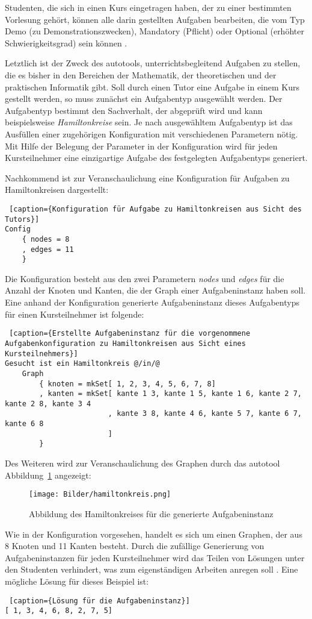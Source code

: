 Studenten, die sich in einen Kurs eingetragen haben, der zu einer bestimmten Vorlesung gehört, können alle darin gestellten Aufgaben bearbeiten, die vom Typ Demo (zu Demonstrationszwecken), Mandatory (Pflicht) oder Optional (erhöhter Schwierigkeitsgrad) sein können \cite[S.~6]{ATauterz}. 

Letztlich ist der Zweck des autotools, unterrichtsbegleitend Aufgaben zu stellen, die es bisher in den Bereichen der Mathematik, der theoretischen und der praktischen Informatik gibt. Soll durch einen Tutor eine Aufgabe in einem Kurs gestellt werden, so muss zunächst ein Aufgabentyp ausgewählt werden. Der Aufgabentyp bestimmt den Sachverhalt, der abgeprüft wird und kann beispielsweise \textit{Hamiltonkreise} sein. Je nach ausgewähltem Aufgabentyp ist das Ausfüllen einer zugehörigen Konfiguration mit verschiedenen Parametern nötig. Mit Hilfe der Belegung der Parameter in der Konfiguration wird für jeden Kursteilnehmer eine einzigartige Aufgabe des festgelegten Aufgabentyps generiert.

Nachkommend ist zur Veranschaulichung eine Konfiguration für Aufgaben zu Hamiltonkreisen dargestellt:
\begin{lstlisting} [caption={Konfiguration für Aufgabe zu Hamiltonkreisen aus Sicht des Tutors}]
Config
	{ nodes = 8
	, edges = 11
	}
\end{lstlisting}
Die Konfiguration besteht aus den zwei Parametern \textit{nodes} und \textit{edges} für die Anzahl der Knoten und Kanten, die der Graph einer Aufgabeninstanz haben soll. 
\newpage
Eine anhand der Konfiguration generierte Aufgabeninstanz dieses Aufgabentyps für einen Kursteilnehmer ist folgende:
\begin{lstlisting} [caption={Erstellte Aufgabeninstanz für die vorgenommene Aufgabenkonfiguration zu Hamiltonkreisen aus Sicht eines Kursteilnehmers}]
Gesucht ist ein Hamiltonkreis @/in/@
	Graph
		{ knoten = mkSet[ 1, 2, 3, 4, 5, 6, 7, 8]
		, kanten = mkSet[ kante 1 3, kante 1 5, kante 1 6, kante 2 7, kante 2 8, kante 3 4
						, kante 3 8, kante 4 6, kante 5 7, kante 6 7, kante 6 8
						] 
		}
\end{lstlisting}
Des Weiteren wird zur Veranschaulichung des Graphen durch das autotool Abbildung~\ref{at_hamilton} angezeigt:
\begin{figure}[H]
	\centering
	\texttt{[image: Bilder/hamiltonkreis.png]}
	\caption{Abbildung des Hamiltonkreises für die generierte Aufgabeninstanz}
	\label{at_hamilton}
\end{figure}
Wie in der Konfiguration vorgesehen, handelt es sich um einen Graphen, der aus 8 Knoten und 11 Kanten besteht.
Durch die zufällige Generierung von Aufgabeninstanzen für jeden Kursteilnehmer wird das Teilen von Lösungen unter den Studenten verhindert, was zum eigenständigen Arbeiten anregen soll \cite[S.~1]{ATnetzw}. Eine mögliche Lösung für dieses Beispiel ist:
\begin{lstlisting} [caption={Lösung für die Aufgabeninstanz}]
[ 1, 3, 4, 6, 8, 2, 7, 5]
\end{lstlisting}

